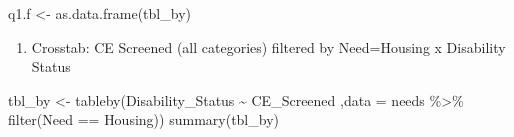 \documentclass[
]{article}
\newenvironment{Shaded}{\begin{snugshade}}{\end{snugshade}}
\newcommand{\AttributeTok}[1]{\textcolor[rgb]{0.77,0.63,0.00}{#1}}
\newcommand{\FunctionTok}[1]{\textcolor[rgb]{0.00,0.00,0.00}{#1}}
\newcommand{\NormalTok}[1]{#1}
\newcommand{\OtherTok}[1]{\textcolor[rgb]{0.56,0.35,0.01}{#1}}
\newcommand{\SpecialCharTok}[1]{\textcolor[rgb]{0.00,0.00,0.00}{#1}}
\newcommand{\StringTok}[1]{\textcolor[rgb]{0.31,0.60,0.02}{#1}}
\providecommand{\tightlist}{%
  \setlength{\itemsep}{0pt}\setlength{\parskip}{0pt}}
\begin{document}
\begin{Shaded}
\begin{Highlighting}[]
\NormalTok{q1.f }\OtherTok{\textless{}{-}} \FunctionTok{as.data.frame}\NormalTok{(tbl\_by)}
\end{Highlighting}
\end{Shaded}

\begin{enumerate}
\def\labelenumi{\alph{enumi}.}
\setcounter{enumi}{6}
\tightlist
\item
  Crosstab: CE Screened (all categories) filtered by Need=Housing x
  Disability Status
\end{enumerate}

\begin{Shaded}
\begin{Highlighting}[]
\NormalTok{tbl\_by }\OtherTok{\textless{}{-}} \FunctionTok{tableby}\NormalTok{(Disability\_Status }\SpecialCharTok{\textasciitilde{}}\NormalTok{ CE\_Screened ,}\AttributeTok{data =}\NormalTok{ needs }\SpecialCharTok{\%\textgreater{}\%} \FunctionTok{filter}\NormalTok{(Need }\SpecialCharTok{==} \StringTok{\textquotesingle{}Housing\textquotesingle{}}\NormalTok{))}
\FunctionTok{summary}\NormalTok{(tbl\_by)}
\end{Highlighting}
\end{Shaded}
\end{document}
